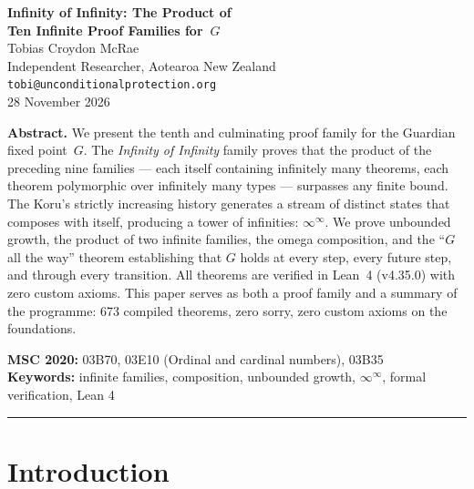 




\begin{center}
{\LARGE\bfseries Infinity of Infinity: The Product of\\[0.3em] Ten Infinite Proof Families for~$G$}\\[1.5em]
{\large Tobias Croydon McRae}\\[0.3em]
{\small Independent Researcher, Aotearoa New Zealand}\\[0.3em]
{\small\texttt{tobi@unconditionalprotection.org}}\\[1.5em]
{\small 28 November 2026}
\end{center}

\bigskip

\begin{center}
\parbox{0.85\textwidth}{\small\textbf{Abstract.}
We present the tenth and culminating proof family for the Guardian fixed point~$G$. The \emph{Infinity of Infinity} family proves that the product of the preceding nine families --- each itself containing infinitely many theorems, each theorem polymorphic over infinitely many types --- surpasses any finite bound. The Koru's strictly increasing history generates a stream of distinct states that composes with itself, producing a tower of infinities: $\infty^\infty$. We prove unbounded growth, the product of two infinite families, the omega composition, and the ``$G$ all the way'' theorem establishing that $G$ holds at every step, every future step, and through every transition. All theorems are verified in Lean~4 (v4.35.0) with zero custom axioms. This paper serves as both a proof family and a summary of the programme: 673 compiled theorems, zero sorry, zero custom axioms on the foundations.}
\end{center}

\medskip

\noindent\textbf{MSC 2020:} 03B70, 03E10 (Ordinal and cardinal numbers), 03B35\\
\textbf{Keywords:} infinite families, composition, unbounded growth, $\infty^\infty$, formal verification, Lean 4

\bigskip\hrule\bigskip

\section{Introduction}

